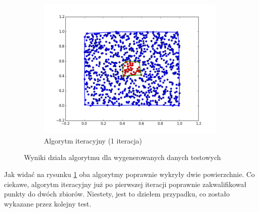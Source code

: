 \begin{figure}[h!]
    \begin{subfigure}[b]{0.5\linewidth}
        \includegraphics[width=\linewidth]{img/test1_3.png}
        \caption{Algorytm iteracyjny (1 iteracja)}
    \end{subfigure}%
    \caption{Wyniki działa algorytmu dla wygenerowanych danych testowych}
    \label{fig:test1}
\end{figure}

Jak widać na rysunku \ref{fig:test1} oba algorytmy poprawnie wykryły dwie powierzchnie. Co ciekawe,
algorytm iteracyjny już po pierwszej iteracji poprawnie zakwalifikował punkty do dwóch zbiorów. Niestety, jest to
dziełem przypadku, co zostało wykazane przez kolejny test.

